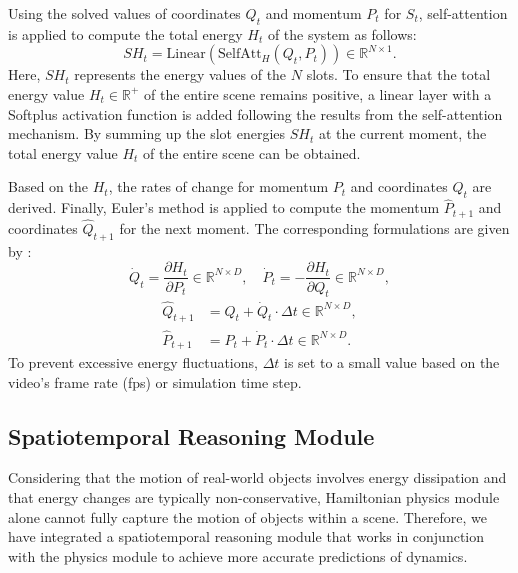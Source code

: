 \documentclass[sigconf]{acmart}
\begin{document}
Using the solved values of coordinates $Q_t$ and momentum $P_t$ for $S_t$, self-attention is applied to compute the total energy $H_t$ of the system as follows:
\begin{equation}
\label{eq2}
SH_t = \mathrm{Linear}(\mathrm{SelfAtt}_H(Q_t,P_t)) \in \mathbb{R}^{N \times 1} .
\end{equation}
Here, $SH_t$ represents the energy values of the $N$ slots. To ensure that 
the total energy value $H_t \in \mathbb{R}^+$ of the entire scene remains positive, a linear layer with a Softplus activation function is added following the results from the self-attention mechanism. By summing up the slot energies $SH_t$ at the current moment, the total energy value $H_t$ of the entire scene can be obtained.

Based on the $H_t$, the rates of change for momentum $P_t$ and coordinates $Q_t$ are derived. Finally, Euler's method is applied to compute the momentum $\widehat{P}_{t+1}$ and coordinates $\widehat{Q}_{t+1}$ for the next moment. The corresponding formulations are given by :
\begin{equation}
\label{eq3}
\dot{Q}_t = \frac{\partial H_t}{\partial P_t} \in \mathbb{R}^{N \times D}, \quad \dot{P}_t = -\frac{\partial H_t}{\partial Q_t} \in \mathbb{R}^{N \times D} ,
\end{equation}
\begin{subequations}
\label{eq4}
\begin{align}
\widehat{Q}_{t+1} &= Q_t + \dot{Q}_t \cdot \Delta t \in \mathbb{R}^{N \times D} ,\\
\widehat{P}_{t+1} &= P_t + \dot{P}_t \cdot \Delta t \in \mathbb{R}^{N \times D} .
\end{align}
\end{subequations}
To prevent excessive energy fluctuations, $\Delta t$ is set to a small value based on the video's frame rate (fps) or simulation time step.

\subsection{Spatiotemporal Reasoning Module}

Considering that the motion of real-world objects involves energy dissipation and that energy changes are typically non-conservative, Hamiltonian physics module alone cannot fully capture the motion of objects within a scene. Therefore, we have integrated a spatiotemporal reasoning module that works in conjunction with the physics module to achieve more accurate predictions of dynamics.
\end{document}
